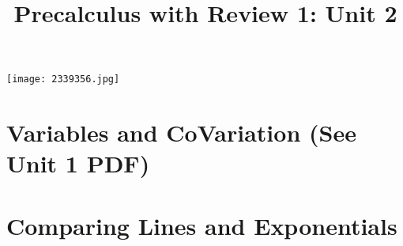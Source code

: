 \documentclass[handout]{xourse}
\title{Precalculus with Review 1: Unit 2}
\begin{document}
\texttt{[image: 2339356.jpg]}
\maketitle


	




%
\part{Variables and CoVariation (See Unit 1 PDF)}  %
%
%
%
%




\part{Comparing Lines and Exponentials} 
\end{document}
